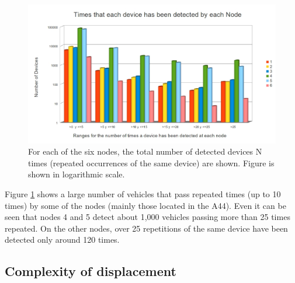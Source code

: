 \documentclass[preprint,authoryear,12pt]{elsarticle}
\begin{document}
 \begin{figure}[htb]
 \begin{center}
 \includegraphics[scale=0.4]{Intervalos.jpg}
 \caption{For each of the six nodes, the total number of detected devices N times (repeated occurrences of the same device) are shown. Figure is shown in logarithmic scale.
 \label{Intervalos}}
 \end{center}
 \end{figure} 


Figure \ref{Intervalos} shows a large number of vehicles that pass repeated times (up to 10 times) by some of the nodes (mainly those located in the A44).
Even it can be seen that nodes 4 and 5 detect about 1,000 vehicles passing more than 25 times repeated. 
On the other nodes, over 25 repetitions of the same device have been detected only around 120 times.


\subsection{Complexity of displacement}
\end{document}
